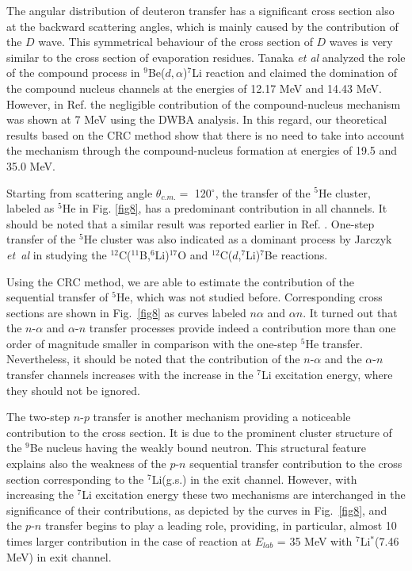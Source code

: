 \documentclass[
12pt, %
oneside, %
english, %
onehalfspacing, %
headsepline, %
]{MastersDoctoralThesis} %
\begin{document}
The angular distribution of deuteron transfer has a significant cross section also at the backward scattering angles, which is mainly caused by the contribution of the $D$ wave. This symmetrical behaviour of the cross section of $D$ waves is very similar to the cross section of evaporation residues. Tanaka \textit{et al} \cite{tanaka1978} analyzed the role of the compound process in ${}^9$Be($d,\alpha$)${}^7$Li reaction and claimed the domination of the compound nucleus channels at the energies of 12.17 MeV and 14.43 MeV. However, in Ref. \cite{bodek1989} the negligible contribution of the compound-nucleus mechanism was shown at 7 MeV using the DWBA analysis. In this regard, our theoretical results based on the CRC method show that there is no need to take into account the mechanism through the compound-nucleus formation at energies of 19.5 and 35.0 MeV.

Starting from scattering angle $\theta_{c.m.} =$ 120$^\circ$, the transfer of the ${}^5$He cluster, labeled as ${}^5$He in Fig. \ref{fig8}, has a predominant contribution in all channels. It should be noted that a similar result was reported earlier in Ref. \cite{bodek1989}. One-step transfer of the ${}^5$He cluster was also indicated as a dominant process by Jarczyk \textit{et~al} \cite{jarczyk1996} in studying the ${}^{12}$C(${}^{11}$B,${}^6$Li)${}^{17}$O and ${}^{12}$C($d$,${}^7$Li)${}^{7}$Be reactions.

Using the CRC method, we are able to estimate the contribution of the sequential transfer of ${}^5$He, which was not studied before. Corresponding cross sections are shown in Fig.~\ref{fig8} as curves labeled $n\alpha$ and $\alpha n$.
It turned out that the $n$-$\alpha$ and $\alpha$-$n$ transfer processes provide indeed a contribution more than one order of magnitude smaller in comparison with the one-step ${}^5$He transfer. Nevertheless, it should be noted that the contribution of the $n$-$\alpha$ and the $\alpha$-$n$ transfer channels increases with the increase in the ${}^7$Li excitation energy, where they should not be ignored.


The two-step $n$-$p$ transfer is another mechanism providing a noticeable contribution to the cross section. It is due to the prominent cluster structure of the ${}^9$Be nucleus having the weakly bound neutron. This structural feature explains also the weakness of the $p$-$n$ sequential transfer contribution to the cross section corresponding to the ${}^7$Li(g.s.) in the exit channel. However, with increasing the ${}^7$Li excitation energy these two mechanisms are interchanged in the significance of their contributions, as depicted by the curves in Fig.~\ref{fig8}, and the $p$-$n$ transfer begins to play a leading role, providing, in particular, almost 10 times larger contribution in the case of reaction at $E_{lab}$ = 35 MeV with ${}^7$Li$^*$(7.46 MeV) in exit channel.
\end{document}
